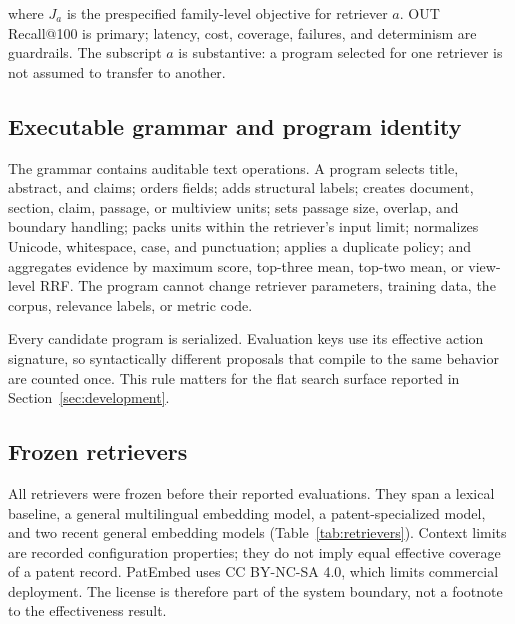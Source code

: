 \documentclass[final,5p,times,twocolumn]{elsarticle}
\begin{document}
where \(J_a\) is the prespecified family-level objective for retriever \(a\). OUT
Recall@100 is primary; latency, cost, coverage, failures, and determinism are
guardrails. The subscript \(a\) is substantive: a program selected for one
retriever is not assumed to transfer to another.

\subsection{Executable grammar and program identity}

The grammar contains auditable text operations. A program selects title,
abstract, and claims; orders fields; adds structural labels; creates document,
section, claim, passage, or multiview units; sets passage size, overlap, and
boundary handling; packs units within the retriever's input limit; normalizes
Unicode, whitespace, case, and punctuation; applies a duplicate policy; and
aggregates evidence by maximum score, top-three mean, top-two mean, or
view-level RRF. The program cannot change retriever parameters, training data,
the corpus, relevance labels, or metric code.

Every candidate program is serialized. Evaluation keys use its effective
action signature, so syntactically different proposals that compile to the
same behavior are counted once. This rule matters for the flat search surface
reported in Section~\ref{sec:development}.

\subsection{Frozen retrievers}

All retrievers were frozen before their reported evaluations. They span a lexical
baseline, a general multilingual embedding model, a patent-specialized model,
and two recent general embedding models (Table~\ref{tab:retrievers}). Context limits
are recorded configuration properties; they do not imply equal effective
coverage of a patent record. PatEmbed uses CC BY-NC-SA 4.0, which limits
commercial deployment. The license is therefore part of the system boundary,
not a footnote to the effectiveness result.
\end{document}
